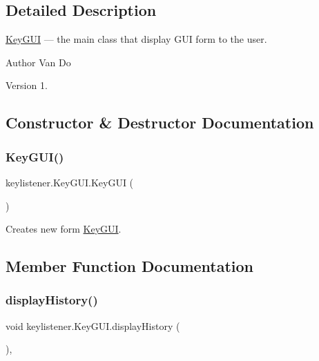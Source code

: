\subsection{Detailed Description}
\hyperlink{classkeylistener_1_1_key_g_u_i}{Key\+G\+UI} --- the main class that display G\+UI form to the user. \begin{DoxyAuthor}{Author}
Van Do 
\end{DoxyAuthor}
\begin{DoxyVersion}{Version}
1. 
\end{DoxyVersion}


\subsection{Constructor \& Destructor Documentation}
\mbox{\label{classkeylistener_1_1_key_g_u_i_af48eff8474974c6c21eb0c36feaf65ad}} 
\subsubsection{\texorpdfstring{Key\+G\+U\+I()}{KeyGUI()}}
{\footnotesize\ttfamily keylistener.\+Key\+G\+U\+I.\+Key\+G\+UI (\begin{DoxyParamCaption}{ }\end{DoxyParamCaption})\hspace{0.3cm}{\ttfamily [inline]}}

Creates new form \hyperlink{classkeylistener_1_1_key_g_u_i}{Key\+G\+UI}. 

\subsection{Member Function Documentation}
\mbox{\label{classkeylistener_1_1_key_g_u_i_aee81c72d2c77342da78a38116883cf6f}} 
\subsubsection{\texorpdfstring{display\+History()}{displayHistory()}}
{\footnotesize\ttfamily void keylistener.\+Key\+G\+U\+I.\+display\+History (\begin{DoxyParamCaption}{ }\end{DoxyParamCaption})\hspace{0.3cm}{\ttfamily [inline]}, {\ttfamily [private]}}

